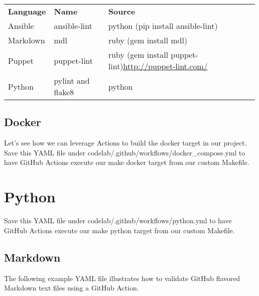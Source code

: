 \begin{table}[h]
	\begin{center}
		\begin{tabular}{| p{2.5cm}| p{2.5cm} | p{2.5cm} |}
			\hline
			\textbf{Language} & \textbf{Name} & \textbf{Source}\hfill                                                        \\
			Ansible           & ansible-lint  & python (pip install ansible-lint)                                      \\
			Markdown          & mdl           & ruby (gem install mdl)                                                 \\
			Puppet            & puppet-lint   & ruby (gem install puppet-lint)\url{http://puppet-lint.com/} \\
			Python            & pylint and flake8 & python \\
		\end{tabular}
	\end{center}
\end{table}

\subsection{Docker}
\justifying
Let's see how we can leverage Actions to build the docker target in our
project. Save this YAML file under
codelab/.github/workflows/docker\_compose.yml to have GitHub Actions
execute our make docker target from our custom Makefile.

%	


\section{Python}
\justifying
Save this YAML file under codelab/.github/workflows/python.yml to have
GitHub Actions execute our make python target from our custom Makefile.

%	

\subsection{Markdown}
\justifying
The following example YAML file illustrates how to validate GitHub
flavored Markdown text files using a GitHub Action.

